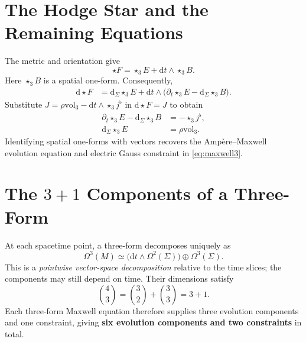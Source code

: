 \documentclass[11pt,openany]{book}
\numberwithin{equation}{chapter}
\theoremstyle{definition}
\theoremstyle{remark}
\newcommand{\dd}{\mathrm d}
\newcommand{\vol}{\mathrm{vol}}
\newcommand{\starS}{\star_3}
\begin{document}
\section{The Hodge Star and the Remaining Equations}
The metric and orientation give
\begin{equation}\label{eq:starF}
\star F=\starS E+\dd t\wedge\starS B.
\end{equation}
Here $\starS B$ is a spatial one-form. Consequently,
\begin{align}
\dd\star F
 &=\dd_\Sigma\starS E
   +\dd t\wedge\bigl(\partial_t\starS E-\dd_\Sigma\starS B\bigr).
\end{align}
Substitute $J=\rho\vol_3-\dd t\wedge\starS j^\flat$ in $\dd\star F=J$ to obtain
\begin{equation}\label{eq:splitAmpere}
\boxed{
\begin{aligned}
\partial_t\starS E-\dd_\Sigma\starS B&=-\starS j^\flat,\\
\dd_\Sigma\starS E&=\rho\vol_3.
\end{aligned}}
\end{equation}
Identifying spatial one-forms with vectors recovers the Amp\`ere--Maxwell evolution equation and electric Gauss constraint in \eqref{eq:maxwell3}.

\section{The \texorpdfstring{$3+1$}{3+1} Components of a Three-Form}
At each spacetime point, a three-form decomposes uniquely as
\begin{equation}\label{eq:3formsplit}
\Omega^3(M)\simeq
\bigl(\dd t\wedge\Omega^2(\Sigma)\bigr)\oplus\Omega^3(\Sigma).
\end{equation}
This is a \emph{pointwise vector-space decomposition} relative to the time slices; the components may still depend on time. Their dimensions satisfy
\begin{equation}
\binom43=\binom32+\binom33=3+1.
\end{equation}
Each three-form Maxwell equation therefore supplies three evolution components and one constraint, giving \textbf{six evolution components and two constraints} in total.
\end{document}
